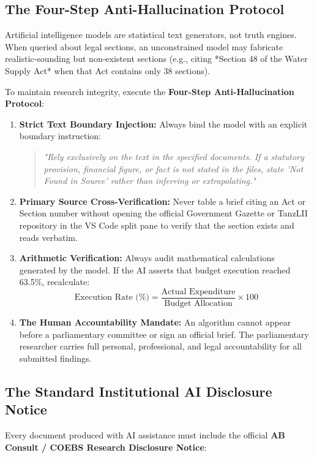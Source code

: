 \documentclass[11pt, a4paper]{report}
\begin{document}
\subsection{The Four-Step Anti-Hallucination Protocol}
Artificial intelligence models are statistical text generators, not truth engines. When queried about legal sections, an unconstrained model may fabricate realistic-sounding but non-existent sections (e.g., citing *Section 48 of the Water Supply Act* when that Act contains only 38 sections).

To maintain research integrity, execute the \textcolor{tanzaniablue}{\textbf{Four-Step Anti-Hallucination Protocol}}:

\begin{enumerate}[label=\textbf{Step \arabic*:}]
    \item \textbf{Strict Text Boundary Injection:} Always bind the model with an explicit boundary instruction:
    \begin{quote}
        \small\textit{"Rely exclusively on the text in the specified documents. If a statutory provision, financial figure, or fact is not stated in the files, state 'Not Found in Source' rather than inferring or extrapolating."}
    \end{quote}
    \item \textbf{Primary Source Cross-Verification:} Never table a brief citing an Act or Section number without opening the official Government Gazette or TanzLII repository in the VS Code split pane to verify that the section exists and reads verbatim.
    \item \textbf{Arithmetic Verification:} Always audit mathematical calculations generated by the model. If the AI asserts that budget execution reached 63.5\%, recalculate:
    \begin{equation*}
        \text{Execution Rate (\%)} = \frac{\text{Actual Expenditure}}{\text{Budget Allocation}} \times 100
    \end{equation*}
    \item \textbf{The Human Accountability Mandate:} An algorithm cannot appear before a parliamentary committee or sign an official brief. The parliamentary researcher carries full personal, professional, and legal accountability for all submitted findings.
\end{enumerate}

\subsection{The Standard Institutional AI Disclosure Notice}
Every document produced with AI assistance must include the official \textbf{AB Consult / COEBS Research Disclosure Notice}:
\end{document}
